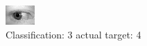\begin{figure}[h!]
\begin{center}
\includegraphics[width=0.60\columnwidth]{figures/ID727_class_3_target_4.png}
\end{center}
\caption{ Classification: 3 actual target: 4}
\label{fig:ID727_class_3_target_4}
\end{figure}
